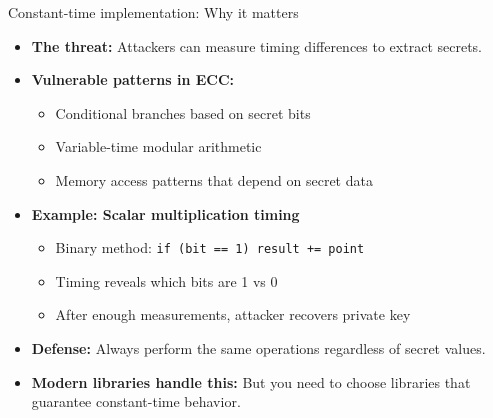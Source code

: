 \documentclass[aspectratio=169, lualatex, handout]{beamer}
\begin{document}
\begin{frame}{Constant-time implementation: Why it matters}
	\begin{itemize}
		\item \textbf{The threat:} Attackers can measure timing differences to extract secrets.
		\item \textbf{Vulnerable patterns in ECC:}
		      \begin{itemize}
			      \item Conditional branches based on secret bits
			      \item Variable-time modular arithmetic
			      \item Memory access patterns that depend on secret data
		      \end{itemize}
		\item \textbf{Example: Scalar multiplication timing}
		      \begin{itemize}
			      \item Binary method: \texttt{if (bit == 1) result += point}
			      \item Timing reveals which bits are 1 vs 0
			      \item After enough measurements, attacker recovers private key
		      \end{itemize}
		\item \textbf{Defense:} Always perform the same operations regardless of secret values.
		\item \textbf{Modern libraries handle this:} But you need to choose libraries that guarantee constant-time behavior.
	\end{itemize}
\end{frame}
\end{document}

